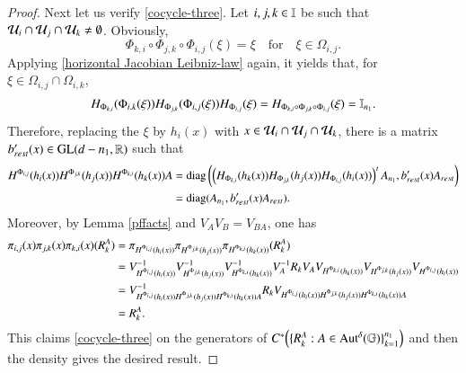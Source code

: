 \documentclass[leqno]{amsart}
\begin{document}
\begin{proof}
		
		Next let us verify \eqref{cocycle-three}. Let $i,j,k\in\mathbb I$ be such that ${\mathcal U}_{i}\cap{\mathcal U}_{j}\cap{\mathcal U}_{k}\neq\emptyset$. Obviously,
		$$\Phi_{k,i}\circ\Phi_{j,k}\circ\Phi_{i,j}(\xi)=\xi \quad\mbox{for}\quad \xi\in\Omega_{i,j}.$$
		Applying \eqref{horizontal Jacobian Leibniz-law} again, it yields that, for $\xi\in\Omega_{i,j}\cap\Omega_{i,k}$,
		\begin{align*}
			H_{\Phi_{k,i}}(\Phi_{i.k}(\xi))H_{\Phi_{j,k}}(\Phi_{i,j}(\xi))H_{\Phi_{i,j}}(\xi)
			=H_{\Phi_{k,i}\circ\Phi_{j,k}\circ\Phi_{i,j}}(\xi)
			=\mathbb I_{n_{1}}.
		\end{align*}
		Therefore, replacing the $\xi$ by $h_{i}(x)$ with $x\in{\mathcal U}_{i}\cap{\mathcal U}_{j}\cap{\mathcal U}_{k}$, there is a matrix $b'_{rest}(x)\in{\rm GL}(d-n_{1},\mathbb{R})$ such that
		\begin{align*}
			H^{\Phi_{i,j}}(h_{i}(x))H^{\Phi_{j,k}}(h_{j}(x))H^{\Phi_{k,i}}(h_{k}(x))A
			&={\rm diag}\left(\left(H_{\Phi_{k,i}}(h_{k}(x))H_{\Phi_{j,k}}(h_{j}(x))H_{\Phi_{i,j}}(h_{i}(x))\right)^{t}A_{n_{1}},b'_{rest}(x)A_{rest} \right)\\
			&={\rm diag}(A_{n_{1}},b'_{rest}(x)A_{rest}).
		\end{align*}
		Moreover, by Lemma \ref{pffacts} and $V_{A}V_{B}=V_{BA}$, one has
		\begin{align*}
			\pi_{i,j}(x)\pi_{j,k}(x)\pi_{k,i}(x)({ R}^{A}_{k})
			&=\pi_{H^{\Phi_{i,j}}(h_{i}(x))}\pi_{H^{\Phi_{j,k}}(h_{j}(x))}\pi_{H^{\Phi_{k,i}}(h_{k}(x))}({ R}^{A}_{k})\\
			&=V_{H^{\Phi_{i,j}}(h_{i}(x))}^{-1} V_{H^{\Phi_{j,k}}(h_{j}(x))}^{-1} V_{H^{\Phi_{k,i}}(h_{k}(x))}^{-1} V_{A}^{-1} R_{k} V_{A} V_{H^{\Phi_{k,i}}(h_{k}(x))} V_{H^{\Phi_{j,k}}(h_{j}(x))} V_{H^{\Phi_{i,j}}(h_{i}(x))}\\
			&=V_{H^{\Phi_{i,j}}(h_{i}(x))H^{\Phi_{j,k}}(h_{j}(x))H^{\Phi_{k,i}}(h_{k}(x))A}^{-1} R_{k} V_{H^{\Phi_{i,j}}(h_{i}(x))H^{\Phi_{j,k}}(h_{j}(x))H^{\Phi_{k,i}}(h_{k}(x))A}\\
			&={ R}^{A}_{k}.
		\end{align*}
		This claims \eqref{cocycle-three} on the generators of $C^{*}\Big(\{{ R}^{A}_{k}:A\in{\rm Aut^{\delta}}(\mathbb{G})\}_{k=1}^{n_{1}}\Big)$ and then the density gives the desired result.
		
		
	\end{proof}
	
\end{document}
